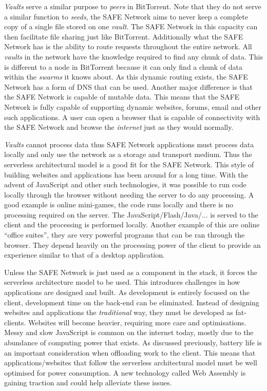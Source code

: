 \textit{Vaults} serve a similar purpose to \textit{peers} in BitTorrent. Note that they do not serve a similar function to \textit{seeds}, the SAFE Network aims to never keep a complete copy of a single file stored on one \textit{vault}. The SAFE Network in this capacity can then facilitate file sharing just like BitTorrent. Additionally what the SAFE Network has is the ability to route requests throughout the entire network. All \textit{vaults} in the network have the knowledge required to find any chunk of data. This is different to a node in BitTorrent because it can only find a chunk of data within the \textit{swarms} it knows about. As this dynamic routing exists, the SAFE Network has a form of DNS that can be used. Another major difference is that the SAFE Network is capable of mutable data. This means that the SAFE Network is fully capable of supporting dynamic websites, forums, email and other such applications. A user can open a browser that is capable of connectivity with the SAFE Network and browse the \textit{internet} just as they would normally.

\textit{Vaults} cannot process data thus SAFE Network applications must process data locally and only use the network as a storage and transport medium. Thus the serverless architectural model is a good fit for the SAFE Network. This style of building websites and applications has been around for a long time. With the advent of JavaScript and other such technologies, it was possible to run code locally through the browser without needing the server to do any processing. A good example is online mini-games, the code runs locally and there is no processing required on the server. The JavaScript/Flash/Java/... is served to the client and the processing is performed locally. Another example of this are online ``office suites'', they are very powerful programs that can be ran through the browser. They depend heavily on the processing power of the client to provide an experience similar to that of a desktop application.

Unless the SAFE Network is just used as a component in the stack, it forces the serverless architecture model to be used. This introduces challenges in how applications are designed and built. As development is entirely focused on the client, development time on the back-end can be eliminated. Instead of designing websites and applications the \textit{traditional} way, they must be developed as fat-clients. Websites will become heavier, requiring more care and optimisations. Messy and slow JavaScript is common on the internet today, mostly due to the abundance of computing power that exists. As discussed previously, battery life is an important consideration when offloading work to the client. This means that applications/websites that follow the serverless architectural model must be well optimised for power consumption. A new technology called Web Assembly is gaining traction and could help alleviate these issues.

